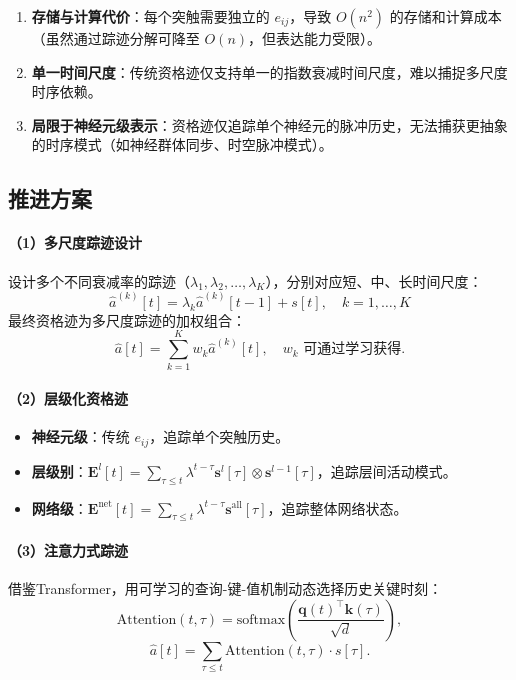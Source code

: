 \documentclass[journal,12pt,onecolumn]{IEEEtran}
\begin{document}
\begin{enumerate}
    \item \textbf{存储与计算代价}：每个突触需要独立的 \(e_{ij}\)，导致 \(O(n^2)\) 的存储和计算成本（虽然通过踪迹分解可降至 \(O(n)\)，但表达能力受限）。
    \item \textbf{单一时间尺度}：传统资格迹仅支持单一的指数衰减时间尺度，难以捕捉多尺度时序依赖。
    \item \textbf{局限于神经元级表示}：资格迹仅追踪单个神经元的脉冲历史，无法捕获更抽象的时序模式（如神经群体同步、时空脉冲模式）。
\end{enumerate}

\subsection{推进方案}

\paragraph{（1）多尺度踪迹设计}
设计多个不同衰减率的踪迹（\(\lambda_1, \lambda_2, \dots, \lambda_K\)），分别对应短、中、长时间尺度：
\[
\hat{a}^{(k)}[t] = \lambda_k \hat{a}^{(k)}[t-1] + s[t], \quad k=1,\dots,K
\]
最终资格迹为多尺度踪迹的加权组合：
\[
\hat{a}[t] = \sum_{k=1}^{K} w_k \hat{a}^{(k)}[t], \quad w_k \text{ 可通过学习获得}.
\]

\paragraph{（2）层级化资格迹}
\begin{itemize}
    \item \textbf{神经元级}：传统 \(e_{ij}\)，追踪单个突触历史。
    \item \textbf{层级别}：\(\mathbf{E}^l[t] = \sum_{\tau \le t} \lambda^{t-\tau} \mathbf{s}^l[\tau] \otimes \mathbf{s}^{l-1}[\tau]\)，追踪层间活动模式。
    \item \textbf{网络级}：\(\mathbf{E}^{\text{net}}[t] = \sum_{\tau \le t} \lambda^{t-\tau} \mathbf{s}^{\text{all}}[\tau]\)，追踪整体网络状态。
\end{itemize}

\paragraph{（3）注意力式踪迹}
借鉴Transformer，用可学习的查询-键-值机制动态选择历史关键时刻：
\[
\text{Attention}(t, \tau) = \text{softmax}\left( \frac{\mathbf{q}(t)^\top \mathbf{k}(\tau)}{\sqrt{d}} \right),
\]
\[
\hat{a}[t] = \sum_{\tau \le t} \text{Attention}(t, \tau) \cdot s[\tau].
\]
\end{document}

